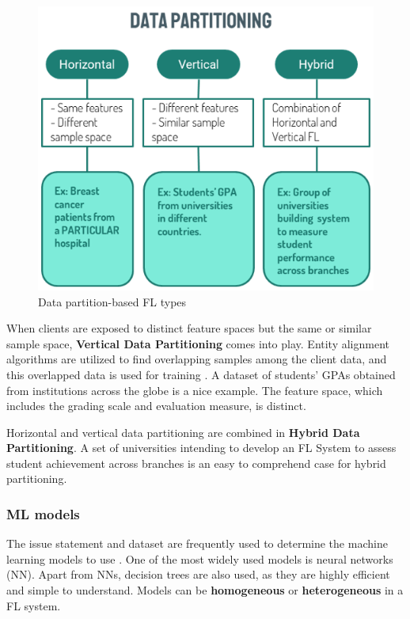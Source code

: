 \begin{figure}[H]
\centering
\includegraphics[scale=0.5]{img/fl_data_partition.png}
\caption{Data partition-based FL types}
\label{fig:fl_data_partition}
\end{figure}

When clients are exposed to distinct feature spaces but the same or similar sample space, \textbf{Vertical Data Partitioning} comes into play. Entity alignment algorithms are utilized to find overlapping samples among the client data, and this overlapped data is used for training \cite{fl26_types}. A dataset of students' GPAs obtained from institutions across the globe is a nice example. The feature space, which includes the grading scale and evaluation measure, is distinct.

Horizontal and vertical data partitioning are combined in \textbf{Hybrid Data Partitioning}. A set of universities intending to develop an FL System to assess student achievement across branches is an easy to comprehend case for hybrid partitioning.

\subsubsection{ML models}

The issue statement and dataset are frequently used to determine the machine learning models to use \cite{fl26_types}. One of the most widely used models is neural networks (NN). Apart from NNs, decision trees are also used, as they are highly efficient and simple to understand. Models can be \textbf{homogeneous} or \textbf{heterogeneous} in a FL system. 

